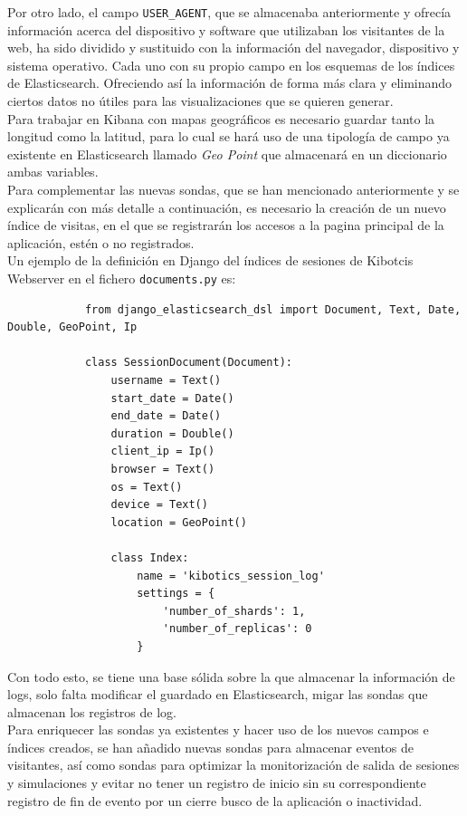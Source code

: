 \documentclass[a4paper, 12pt]{book}
\begin{document}
		Por otro lado, el campo \texttt{USER\_AGENT}, que se almacenaba anteriormente y ofrecía información acerca del dispositivo y software que utilizaban los visitantes de la web, ha sido dividido y sustituido con la información del navegador, dispositivo y sistema operativo. Cada uno con su propio campo en los esquemas de los índices de Elasticsearch. Ofreciendo así la información de forma más clara y eliminando ciertos datos no útiles para las visualizaciones que se quieren generar.\\
		
		Para trabajar en Kibana con mapas geográficos es necesario guardar tanto la longitud como la latitud, para lo cual se hará uso de una tipología de campo ya existente en Elasticsearch llamado \textit{Geo Point} que almacenará en un diccionario ambas variables.\\
		
		Para complementar las nuevas sondas, que se han mencionado anteriormente y se explicarán con más detalle a continuación, es necesario la creación de un nuevo índice de visitas, en el que se registrarán los accesos a la pagina principal de la aplicación, estén o no registrados.\\
		
		Un ejemplo de la definición en Django del índices de sesiones de Kibotcis Webserver en el fichero \texttt{documents.py} es:
		
		{\footnotesize
		\begin{verbatim}
			from django_elasticsearch_dsl import Document, Text, Date, Double, GeoPoint, Ip
			
			class SessionDocument(Document):
			    username = Text()
			    start_date = Date()
			    end_date = Date()
			    duration = Double()
			    client_ip = Ip()
			    browser = Text()
			    os = Text()
			    device = Text()
			    location = GeoPoint()
			
			    class Index:
			        name = 'kibotics_session_log'
			        settings = {
			            'number_of_shards': 1,
			            'number_of_replicas': 0
			        }		
		\end{verbatim}
		}
		
		Con todo esto, se tiene una base sólida sobre la que almacenar la información de logs, solo falta modificar el guardado en Elasticsearch, migar las sondas que almacenan los registros de log.\\
		
		Para enriquecer las sondas ya existentes y hacer uso de los nuevos campos e índices creados, se han añadido nuevas sondas para almacenar eventos de visitantes, así como sondas para optimizar la monitorización de salida de sesiones y simulaciones y evitar no tener un registro de inicio sin su correspondiente registro de fin de evento por un cierre busco de la aplicación o inactividad.\\
		
\end{document}
